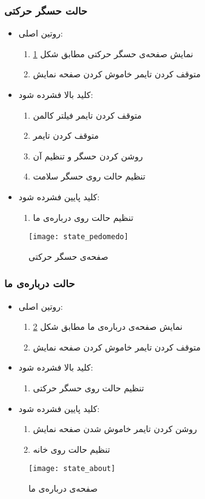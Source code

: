 \subsubsection{حالت حسگر حرکتی}
\begin{itemize}
	\item روتین اصلی:
	\begin{enumerate}
		\item نمایش صفحه‌ی حسگر حرکتی مطابق شکل \ref{fig:state-pedomedo}
		\item متوقف کردن تایمر خاموش کردن صفحه نمایش
	\end{enumerate}
	\item کلید بالا فشرده شود:
	\begin{enumerate}
		\item متوقف کردن تایمر فیلتر کالمن
		\item متوقف کردن تایمر 
		\item روشن کردن حسگر  و تنظیم آن
		\item تنظیم حالت روی حسگر سلامت
	\end{enumerate}
	\item کلید پایین فشرده شود:
	\begin{enumerate}
		\item تنظیم حالت روی درباره‌ی ما
	\end{enumerate}
\end{itemize}
	\begin{figure}[h]
		\centering
		\texttt{[image: state\_pedomedo]}
		\caption{صفحه‌ی حسگر حرکتی}
		\label{fig:state-pedomedo}
	\end{figure}

\subsubsection{حالت درباره‌ی ما}
\begin{itemize}
	\item روتین اصلی:
	\begin{enumerate}
		\item نمایش صفحه‌ی درباره‌ی ما مطابق شکل \ref{fig:state-about}
		\item متوقف کردن تایمر خاموش کردن صفحه نمایش
	\end{enumerate}
	\item کلید بالا فشرده شود:
	\begin{enumerate}
		\item تنظیم حالت روی حسگر حرکتی
	\end{enumerate}
	\item کلید پایین فشرده شود:
	\begin{enumerate}
		\item روشن کردن تایمر خاموش شدن صفحه نمایش
		\item تنظیم حالت روی خانه
	\end{enumerate}
\end{itemize}
	\begin{figure}[h]
		\centering
		\texttt{[image: state\_about]}
		\caption{صفحه‌ی درباره‌ی ما}
		\label{fig:state-about}
	\end{figure}
